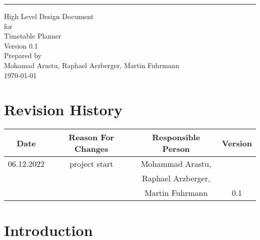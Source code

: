 \documentclass{scrreprt}
\date{}
\def\myversion{0.1}
\begin{document}
	
	\begin{flushright}
		\rule{16cm}{5pt}\vskip1cm
		\begin{bfseries}
			\Huge{High Level Design Document}\\
			\vspace{1.9cm}
			for\\
			\vspace{1.9cm}
			Timetable Planner\\
			\vspace{1.9cm}
			\LARGE{Version \myversion}\\
			\vspace{1.9cm}
			Prepared by \\ {\small Mohamad Arastu, Raphael Arzberger, Martin Fuhrmann}
			\vspace{1.9cm} \\
			\today\\
		\end{bfseries}
	\end{flushright}
	
	\tableofcontents
	
	
	\chapter*{Revision History}
	
	\begin{center}
		\begin{tabular}{|c|c|c|c|}
			\hline
			Date & Reason For Changes & Responsible Person & Version\\
			\hline
			06.12.2022 & project start & Mohammad Arastu, & \\&&Raphael Arzberger, & \\&&Martin Fuhrmann & 0.1\\
			\hline
		\end{tabular}
	\end{center}
	
	\chapter{Introduction}
	
\end{document}
